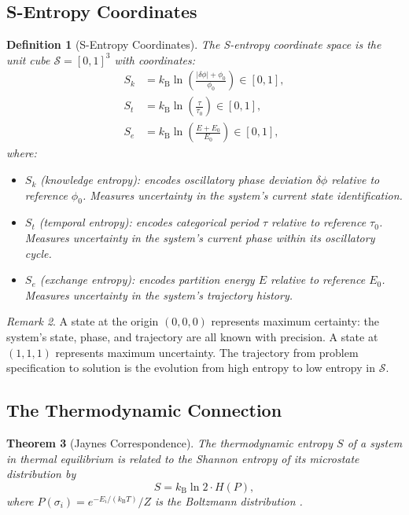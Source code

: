 \documentclass[twocolumn,10pt]{article}
\newtheorem{theorem}{Theorem}[section]
\newtheorem{definition}[theorem]{Definition}
\theoremstyle{remark}
\newtheorem{remark}[theorem]{Remark}
\newcommand{\kB}{k_{\mathrm{B}}}
\newcommand{\Sk}{S_k}
\newcommand{\St}{S_t}
\newcommand{\Se}{S_e}
\newcommand{\Sspace}{\mathcal{S}}
\begin{document}
\subsection{S-Entropy Coordinates}
\label{sec:sentropy_coords}

\begin{definition}[S-Entropy Coordinates]
\label{def:sentropy}
The \emph{S-entropy coordinate space} is the unit cube $\Sspace = [0,1]^3$ with coordinates:
\begin{align}
    \Sk &= \kB \ln\!\left(\frac{|\delta\phi| + \phi_0}{\phi_0}\right) \in [0,1], \label{eq:sk} \\
    \St &= \kB \ln\!\left(\frac{\tau}{\tau_0}\right) \in [0,1], \label{eq:st} \\
    \Se &= \kB \ln\!\left(\frac{E + E_0}{E_0}\right) \in [0,1], \label{eq:se}
\end{align}
where:
\begin{itemize}
    \item $\Sk$ (\emph{knowledge entropy}): encodes oscillatory phase deviation $\delta\phi$ relative to reference $\phi_0$.  Measures uncertainty in the system's current state identification.
    \item $\St$ (\emph{temporal entropy}): encodes categorical period $\tau$ relative to reference $\tau_0$.  Measures uncertainty in the system's current phase within its oscillatory cycle.
    \item $\Se$ (\emph{exchange entropy}): encodes partition energy $E$ relative to reference $E_0$.  Measures uncertainty in the system's trajectory history.
\end{itemize}
\end{definition}

\begin{remark}
A state at the origin $(0,0,0)$ represents maximum certainty: the system's state, phase, and trajectory are all known with precision.  A state at $(1,1,1)$ represents maximum uncertainty.  The trajectory from problem specification to solution is the evolution from high entropy to low entropy in $\Sspace$.
\end{remark}

\subsection{The Thermodynamic Connection}

\begin{theorem}[Jaynes Correspondence]
\label{thm:jaynes}
The thermodynamic entropy $S$ of a system in thermal equilibrium is related to the Shannon entropy of its microstate distribution by
\begin{equation}
    S = \kB \ln 2 \cdot H(P),
    \label{eq:jaynes}
\end{equation}
where $P(\sigma_i) = e^{-E_i/(\kB T)}/Z$ is the Boltzmann distribution \cite{jaynes1957a}.
\end{theorem}
\end{document}

